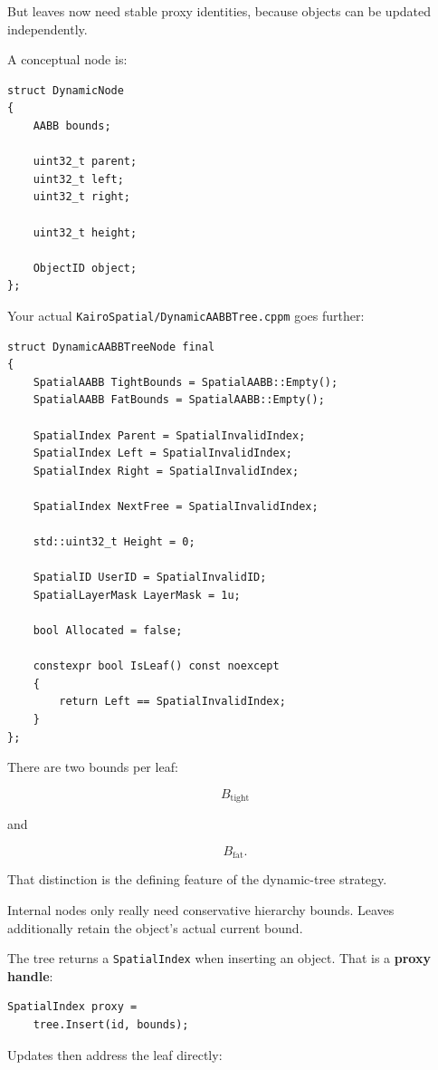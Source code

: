 But leaves now need stable proxy identities, because objects can be updated independently.

A conceptual node is:

\begin{verbatim}
struct DynamicNode
{
    AABB bounds;

    uint32_t parent;
    uint32_t left;
    uint32_t right;

    uint32_t height;

    ObjectID object;
};
\end{verbatim}

Your actual \texttt{KairoSpatial/DynamicAABBTree.cppm} goes further:

\begin{verbatim}
struct DynamicAABBTreeNode final
{
    SpatialAABB TightBounds = SpatialAABB::Empty();
    SpatialAABB FatBounds = SpatialAABB::Empty();

    SpatialIndex Parent = SpatialInvalidIndex;
    SpatialIndex Left = SpatialInvalidIndex;
    SpatialIndex Right = SpatialInvalidIndex;

    SpatialIndex NextFree = SpatialInvalidIndex;

    std::uint32_t Height = 0;

    SpatialID UserID = SpatialInvalidID;
    SpatialLayerMask LayerMask = 1u;

    bool Allocated = false;

    constexpr bool IsLeaf() const noexcept
    {
        return Left == SpatialInvalidIndex;
    }
};
\end{verbatim}

There are two bounds per leaf:

\[
B_{\text{tight}}
\]

and

\[
B_{\text{fat}}.
\]

That distinction is the defining feature of the dynamic-tree strategy.

Internal nodes only really need conservative hierarchy bounds. Leaves additionally retain the object's actual current bound.

The tree returns a \texttt{SpatialIndex} when inserting an object. That is a \textbf{proxy handle}:

\begin{verbatim}
SpatialIndex proxy =
    tree.Insert(id, bounds);
\end{verbatim}

Updates then address the leaf directly:

